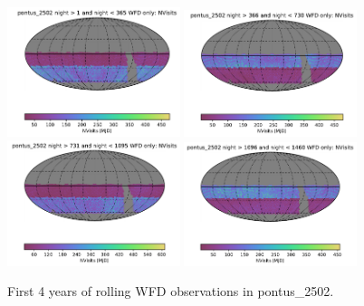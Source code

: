 \documentclass[DM,authoryear,toc]{lsstdoc}
\begin{document}
\begin{figure}[ht]
\centering
\includegraphics[width=0.45\textwidth]{figures/pontus_2502_NVisits_night_gt_1_and_night_lt_365_WFD_only_HEAL_SkyMap.pdf}
\includegraphics[width=0.45\textwidth]{figures/pontus_2502_NVisits_night_gt_366_and_night_lt_730_WFD_only_HEAL_SkyMap.pdf}\\
\includegraphics[width=0.45\textwidth]{figures/pontus_2502_NVisits_night_gt_731_and_night_lt_1095_WFD_only_HEAL_SkyMap.pdf}
\includegraphics[width=0.45\textwidth]{figures/pontus_2502_NVisits_night_gt_1096_and_night_lt_1460_WFD_only_HEAL_SkyMap.pdf}
\caption{First 4 years of rolling WFD observations in  pontus\_2502.}
\label{fig:rolling_nvis-2502}
\end{figure}
\end{document}
